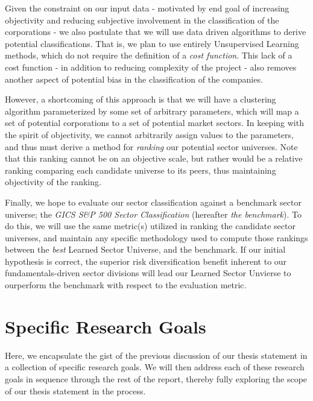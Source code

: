 \documentclass[../main.tex]{subfiles}
\begin{document}
Given the constraint on our input data - motivated by end goal of increasing objectivity and reducing subjective involvement in the classification of the corporations - we also postulate that we will use data driven algorithms to derive potential classifications. That is, we plan to use entirely Unsupervised Learning methods, which do not require the definition of a \textit{cost function}. This lack of a cost function - in addition to reducing complexity of the project - also removes another aspect of potential bias in the classification of the companies.

However, a shortcoming of this approach is that we will have a clustering algorithm parameterized by some set of arbitrary parameters, which will map a set of potential corporations to a set of potential market sectors. In keeping with the spirit of objectivity, we cannot arbitrarily assign values to the parameters, and thus must derive a method for \textit{ranking} our potential sector universes. Note that this ranking cannot be on an objective scale, but rather would be a relative ranking comparing each candidate universe to its peers, thus maintaining objectivity of the ranking.

Finally, we hope to evaluate our sector classification against a benchmark sector universe; the \textit{GICS S\&P 500 Sector Classification} (hereafter \textit{the benchmark}). To do this, we will use the same metric(s) utilized in ranking the candidate sector universes, and maintain any specific methodology used to compute those rankings between the \textit{best} Learned Sector Universe, and the benchmark. If our initial hypothesis is correct, the superior risk diversification benefit inherent to our fundamentals-driven sector divisions will lead our Learned Sector Unvierse to ourperform the benchmark with respect to the evaluation metric.

\section{Specific Research Goals} \label{research_goals:specific_research_goals}

Here, we encapsulate the gist of the previous discussion of our thesis statement in a collection of specific research goals. We will then address each of these research goals in sequence through the rest of the report, thereby fully exploring the scope of our thesis statement in the process.

\vspace{2em}
\end{document}

